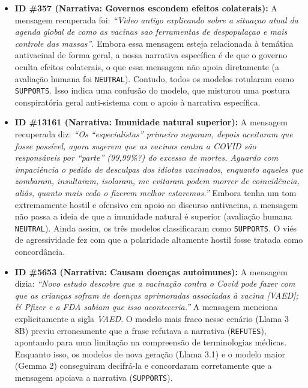 \documentclass[10pt,twocolumn,a4paper]{article}
\begin{document}
\begin{itemize}
    \item \textbf{ID \#357 (Narrativa: Governos escondem efeitos colaterais):} A mensagem recuperada foi: \textit{``Video antigo explicando sobre a situaçao atual da agenda global de como as vacinas sao ferramentas de despopulaçao e mais controle das massas''}. Embora essa mensagem esteja relacionada à temática antivacinal de forma geral, a nossa narrativa específica é de que o governo oculta efeitos colaterais, o que essa mensagem não apoia diretamente (a avaliação humana foi \texttt{NEUTRAL}). Contudo, todos os modelos rotularam como \texttt{SUPPORTS}. Isso indica uma confusão do modelo, que misturou uma postura conspiratória geral anti-sistema com o apoio à narrativa específica.
    \item \textbf{ID \#13161 (Narrativa: Imunidade natural superior):} A mensagem recuperada diz: \textit{``Os “especialistas” primeiro negaram, depois aceitaram que fosse possível, agora sugerem que as vacinas contra a COVID são responsáveis por “parte” (99,99\%?) do excesso de mortes. Aguardo com impaciência o pedido de desculpas dos idiotas vacinados, enquanto aqueles que zombaram, insultaram, isolaram, me evitaram podem morrer de coincidência, aliás, quanto mais cedo o fizerem melhor estaremos.''} Embora tenha um tom extremamente hostil e ofensivo em apoio ao discurso antivacina, a mensagem não passa a ideia de que a imunidade natural é superior (avaliação humana \texttt{NEUTRAL}). Ainda assim, os três modelos classificaram como \texttt{SUPPORTS}. O viés de agressividade fez com que a polaridade altamente hostil fosse tratada como concordância.
    \item \textbf{ID \#5653 (Narrativa: Causam doenças autoimunes):} A mensagem dizia: \textit{``Novo estudo descobre que a vacinação contra o Covid pode fazer com que as crianças sofram de doenças aprimoradas associadas à vacina [VAED]; \& Pfizer e a FDA sabiam que isso aconteceria.''} A mensagem menciona explicitamente a sigla \textit{VAED}. O modelo mais fraco nesse cenário (Llama 3 8B) previu erroneamente que a frase refutava a narrativa (\texttt{REFUTES}), apontando para uma limitação na compreensão de terminologias médicas. Enquanto isso, os modelos de nova geração (Llama 3.1) e o modelo maior (Gemma 2) conseguiram decifrá-la e concordaram corretamente que a mensagem apoiava a narrativa (\texttt{SUPPORTS}).
\end{itemize}
\end{document}
